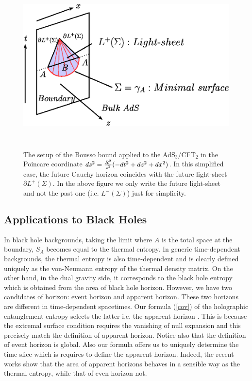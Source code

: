 \documentclass[12pt]{article}
\def\frac#1#2{{#1\over #2}}
\def\frac#1#2{{#1\over #2}}
\begin{document}
\begin{figure}
\begin{center}
\includegraphics[height=9cm,clip]{covariant.eps}
\end{center}
\caption{ \label{bousso.eps} The setup of the Bousso bound applied to
the AdS$_3$/CFT$_2$ in the Poincare coordinate
$ds^2=\frac{R^2}{z^2}(-dt^2+dz^2+dx^2)$. In this simplified case,
the future Cauchy horizon coincides with the future
light-sheet $\partial L^+(\Sigma)$. In the above figure we only
write the future light-sheet and not the past one (i.e. $L^-(\Sigma)$)
just for simplicity.}
\end{figure}

\subsection{Applications to Black Holes}
\hspace{5mm}
In black hole backgrounds, taking the limit where $A$ is the total space at the boundary, $S_A$ becomes
equal to the thermal entropy. In generic time-dependent backgrounds,
the thermal entropy is also time-dependent
and is clearly defined uniquely as the von-Neumann entropy of the thermal density matrix.
On the other hand, in the dual gravity side, it corresponds to the black hole entropy
which is obtained from the area of black hole horizon. However,
we have two candidates of horizon: event horizon
and apparent horizon. These two horizons are different in time-dependent spacetimes.
Our formula (\ref{cov}) of the holographic entanglement entropy selects the latter i.e.
the apparent horizon \cite{Hubeny:2007xt}. This is because the extremal surface condition
requires the vanishing of null expansion and this precisely match the definition of
apparent horizon. Notice also that the definition of event horizon is global.
Also our formula offers us to uniquely determine the
time slice which is requires to define the apparent horizon. Indeed, the recent works
\cite{ChYa,Figueras:2009iu} show that the area of apparent horizons behaves in a sensible way
as the thermal entropy, while that of even horizon not.
\end{document}
